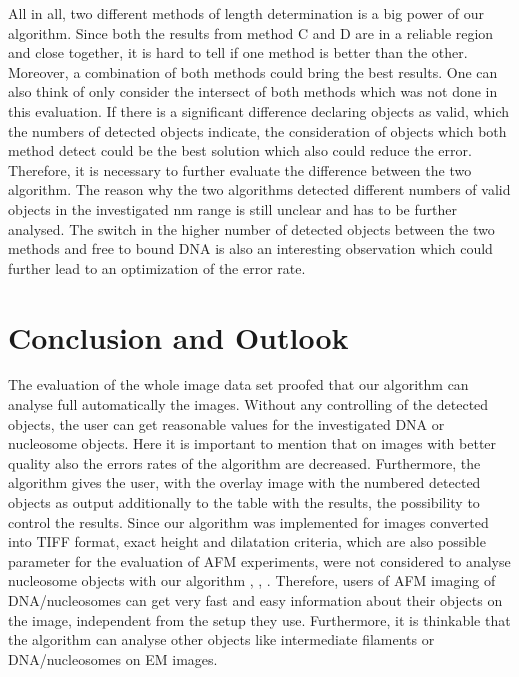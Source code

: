 \documentclass{article}
\begin{document}
All in all, two different methods of length determination is a big power of our algorithm. Since both the results from method C and D are in a reliable region and close together, it is hard to tell if one method is better than the other. Moreover, a combination of both methods could bring the best results. One can also think of only consider the intersect of both methods which was not done in this evaluation. If there is a significant difference declaring objects as valid, which the numbers of detected objects indicate, the consideration of objects which both method detect could be the best solution which also could reduce the error. Therefore, it is necessary to further evaluate the difference between the two algorithm. The reason why the two algorithms detected different numbers of valid objects in the investigated nm range is still unclear and has to be further analysed. The switch in the higher number of detected objects between the two methods and free to bound DNA is also an interesting observation which could further lead to an optimization of the error rate.

\section{Conclusion and Outlook}\label{sec: Conclusion and Outlook}

The evaluation of the whole image data set proofed that our algorithm can analyse full automatically the images. Without any controlling of the detected objects, the user can get reasonable values for the investigated DNA or nucleosome objects. Here it is important to mention that on images with better quality also the errors rates of the algorithm are decreased. Furthermore, the algorithm gives the user, with the overlay image with the numbered detected objects as output additionally to the table with the results, the possibility to control the results. Since our algorithm was implemented for images converted into TIFF format, exact height and dilatation criteria, which are also possible parameter for the evaluation of AFM experiments, were not considered to analyse nucleosome objects with our algorithm \cite{kepert2003conformation}, \cite{montel2007atomic}, \cite{nazarov2016afm}. Therefore, users of AFM imaging of DNA/nucleosomes can get very fast and easy information about their objects on the image, independent from the setup they use. Furthermore, it is thinkable that the algorithm can analyse other objects like intermediate filaments or DNA/nucleosomes on EM images.

\newpage


\end{document}
